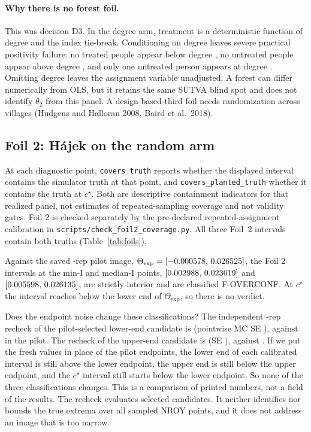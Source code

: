 \documentclass[11pt]{article}
\newcommand{\expset}{\mathrm{exp}}
\begin{document}
\paragraph{Why there is no forest foil.}
This was decision D3. In the degree arm, treatment is a deterministic function of degree and the index tie-break. Conditioning on degree leaves severe practical positivity failure: no treated people appear below degree \DegreeCut, no untreated people appear above degree \DegreeCut, and only one untreated person appears at degree \DegreeCut. Omitting degree leaves the assignment variable unadjusted. A forest can differ numerically from OLS, but it retains the same SUTVA blind spot and does not identify $\theta_2$ from this panel. A design-based third foil needs randomization across villages (Hudgens
and Halloran 2008, Baird et al.\ 2018).

\subsection{Foil 2: Hájek on the random arm}
\label{sec:foil2res}
At each diagnostic point, \texttt{covers\_truth} reports whether the displayed
interval contains the simulator truth at that point, and \texttt{covers\_planted\_truth} whether it contains the truth at $c^\star$.
Both are descriptive containment
indicators for that realized panel, not estimates of repeated-sampling
coverage and not validity gates. Foil 2 is checked separately by the
pre-declared repeated-assignment calibration in
\texttt{scripts/check\_foil2\_coverage.py}. All three Foil~2 intervals
contain both truths (Table~\ref{tab:foils}).

Against the saved \RepsEstimand-rep pilot image, $\Theta_{\expset}=[\ThetaExpLo,\,\ThetaExpHi]$,
the Foil 2 intervals at the min-I and median-I points,
$[0.002988,\,0.023619]$ and $[0.005598,\,0.026135]$, are strictly
interior and are classified F-OVERCONF. At $c^\star$ the interval reaches below the lower end of
$\Theta_{\expset}$, so there is no verdict.

Does the endpoint noise change these classifications? The independent
\RepsEstimand-rep recheck of the pilot-selected lower-end candidate
is \RecheckExpLoFresh{} (pointwise MC SE \RecheckExpLoFreshSE), against
\RecheckExpLoPilot{} in the pilot. The recheck of the upper-end candidate is
\RecheckExpHiFresh{} (SE \RecheckExpHiFreshSE), against \RecheckExpHiPilot. If we put the fresh values in
place of the pilot endpoints, the lower end of each calibrated interval is still above the lower
endpoint, the upper end is still below the upper endpoint, and the $c^\star$ interval
still starts below the lower endpoint. So none of the three classifications changes. This is a comparison of
printed numbers, not a field of the results. The recheck
evaluates selected candidates. It neither identifies nor bounds
the true extrema over all \ThetaSample{} sampled NROY points, and it does not
address an image that is too narrow.
\end{document}
